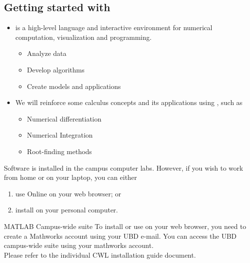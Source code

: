 \subsection{Getting started with }
\begin{frame}{}
\begin{itemize}
	\item {} is a high-level language and interactive environment for numerical computation,
	visualization and programming.
	\begin{itemize}
		\item Analyze data
		\item Develop algorithms
		\item Create models and applications
	\end{itemize}
	\item We will reinforce some calculus concepts and its applications using , such as
	\begin{itemize}
		\item Numerical differentiation
		\item Numerical Integration
		\item Root-finding methods
	\end{itemize}
\end{itemize}
\end{frame}

\begin{frame}{Software}
 is installed in the campus computer labs. 
However, if you wish to work from home or on your laptop, you can either
\begin{enumerate}
	\item use  Online on your web browser; or
	\item install  on your personal computer. 
\end{enumerate}

\begin{alertblock}{MATLAB Campus-wide suite}
To install or use  on your web browser, you need to create a Mathworks
account using your UBD e-mail. You can access the UBD campus-wide suite using your mathworks account.\\
Please refer to the  individual CWL installation guide document.
\end{alertblock}
\end{frame}

